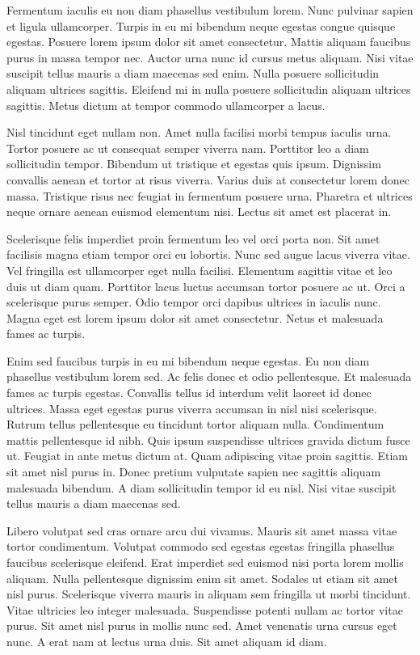 \documentclass[]{tufte-handout}
\begin{document}

Fermentum iaculis eu non diam phasellus vestibulum lorem. Nunc pulvinar
sapien et ligula ullamcorper. Turpis in eu mi bibendum neque egestas
congue quisque egestas. Posuere lorem ipsum dolor sit amet consectetur.
Mattis aliquam faucibus purus in massa tempor nec. Auctor urna nunc id
cursus metus aliquam. Nisi vitae suscipit tellus mauris a diam maecenas
sed enim. Nulla posuere sollicitudin aliquam ultrices sagittis. Eleifend
mi in nulla posuere sollicitudin aliquam ultrices sagittis. Metus dictum
at tempor commodo ullamcorper a lacus.

Nisl tincidunt eget nullam non. Amet nulla facilisi morbi tempus iaculis
urna. Tortor posuere ac ut consequat semper viverra nam. Porttitor leo a
diam sollicitudin tempor. Bibendum ut tristique et egestas quis ipsum.
Dignissim convallis aenean et tortor at risus viverra. Varius duis at
consectetur lorem donec massa. Tristique risus nec feugiat in fermentum
posuere urna. Pharetra et ultrices neque ornare aenean euismod elementum
nisi. Lectus sit amet est placerat in.

Scelerisque felis imperdiet proin fermentum leo vel orci porta non. Sit
amet facilisis magna etiam tempor orci eu lobortis. Nunc sed augue lacus
viverra vitae. Vel fringilla est ullamcorper eget nulla facilisi.
Elementum sagittis vitae et leo duis ut diam quam. Porttitor lacus
luctus accumsan tortor posuere ac ut. Orci a scelerisque purus semper.
Odio tempor orci dapibus ultrices in iaculis nunc. Magna eget est lorem
ipsum dolor sit amet consectetur. Netus et malesuada fames ac turpis.

Enim sed faucibus turpis in eu mi bibendum neque egestas. Eu non diam
phasellus vestibulum lorem sed. Ac felis donec et odio pellentesque. Et
malesuada fames ac turpis egestas. Convallis tellus id interdum velit
laoreet id donec ultrices. Massa eget egestas purus viverra accumsan in
nisl nisi scelerisque. Rutrum tellus pellentesque eu tincidunt tortor
aliquam nulla. Condimentum mattis pellentesque id nibh. Quis ipsum
suspendisse ultrices gravida dictum fusce ut. Feugiat in ante metus
dictum at. Quam adipiscing vitae proin sagittis. Etiam sit amet nisl
purus in. Donec pretium vulputate sapien nec sagittis aliquam malesuada
bibendum. A diam sollicitudin tempor id eu nisl. Nisi vitae suscipit
tellus mauris a diam maecenas sed.

Libero volutpat sed cras ornare arcu dui vivamus. Mauris sit amet massa
vitae tortor condimentum. Volutpat commodo sed egestas egestas fringilla
phasellus faucibus scelerisque eleifend. Erat imperdiet sed euismod nisi
porta lorem mollis aliquam. Nulla pellentesque dignissim enim sit amet.
Sodales ut etiam sit amet nisl purus. Scelerisque viverra mauris in
aliquam sem fringilla ut morbi tincidunt. Vitae ultricies leo integer
malesuada. Suspendisse potenti nullam ac tortor vitae purus. Sit amet
nisl purus in mollis nunc sed. Amet venenatis urna cursus eget nunc. A
erat nam at lectus urna duis. Sit amet aliquam id diam.
\end{document}
